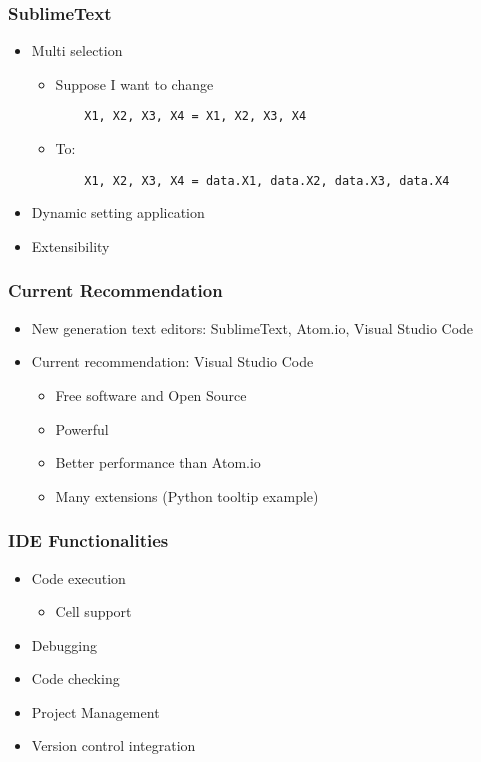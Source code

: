 \documentclass[10pt,article]{article}
\begin{document}
\subsubsection{SublimeText}
\label{sec:org713cb1c}
\begin{itemize}
\item Multi selection

\begin{itemize}
\item Suppose I want to change 

\begin{verbatim}
    X1, X2, X3, X4 = X1, X2, X3, X4
\end{verbatim}

\item To:

\begin{verbatim}
    X1, X2, X3, X4 = data.X1, data.X2, data.X3, data.X4
\end{verbatim}
\end{itemize}

\item Dynamic setting application
\item Extensibility
\end{itemize}
\subsubsection{Current Recommendation}
\label{sec:org08fcfac}
\begin{itemize}
\item New generation text editors: SublimeText, Atom.io, Visual Studio Code
\item Current recommendation: Visual Studio Code
\begin{itemize}
\item Free software and Open Source
\item Powerful
\item Better performance than Atom.io
\item Many extensions (Python tooltip example)
\end{itemize}
\end{itemize}

\subsubsection{IDE Functionalities}
\label{sec:orgfb3fa97}
\begin{multicols}{2}
\begin{itemize}
\item Code execution

\begin{itemize}
\item Cell support
\end{itemize}

\item Debugging
\item Code checking
\item Project Management
\item Version control integration
\end{itemize}

\end{multicols}
\end{document}
